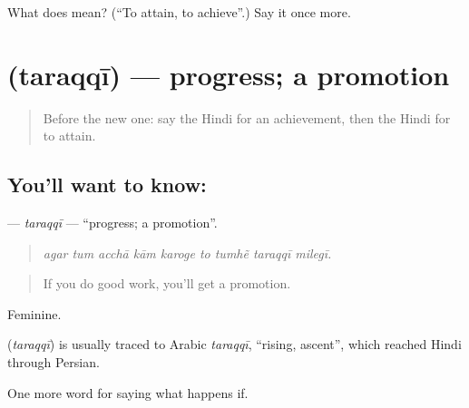 \begin{tcolorbox}[breakable,colback=teal!4,colframe=teal!35!black,title={Before you move on}]
What does   mean? (\textquotedblleft{}To attain, to achieve\textquotedblright{}.) Say it once more.
\end{tcolorbox}
\section[\texorpdfstring{\hi{तरक़्क़ी} (taraqqī)}{तरक़्क़ी (taraqqī)}]{ (taraqqī) — progress; a promotion}

\label{lesson:HI-C393-taraqqi}



\begin{quote}
Before the new one: say the Hindi for an achievement, then the Hindi for to attain.
\end{quote}

\subsection*{You'll want to know: }
\textbf{} — \emph{taraqqī} — \textquotedblleft{}progress; a promotion\textquotedblright{}.

\begin{quote}
        
\end{quote}

\begin{quote}
\emph{agar tum acchā kām karoge to tumhẽ taraqqī milegī.}
\end{quote}

\begin{quote}
If you do good work, you'll get a promotion.
\end{quote}

Feminine.

\begin{cousinweb}
\textbf{} (\emph{taraqqī}) is usually traced to Arabic \emph{taraqqī}, \textquotedblleft{}rising, ascent\textquotedblright{}, which reached Hindi through Persian.
\end{cousinweb}

\begin{grammarlens}[title={What you've built}]
One more word for saying what happens if.
\end{grammarlens}

